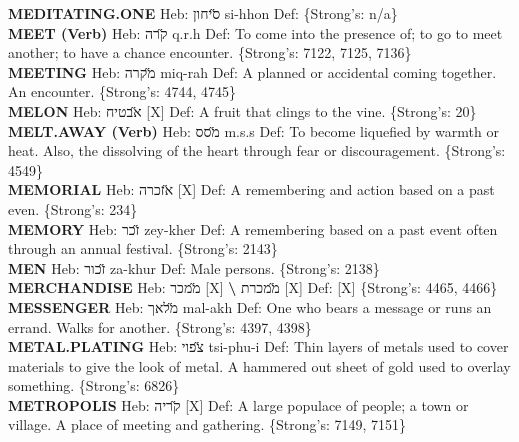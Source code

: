 {\textbf{MEDITATING.ONE} Heb: {\large\H סיחון} si-hhon Def: \{Strong's: n/a\}\hfill{}\\

\textbf{MEET (Verb)} Heb: {\large\H קרה} q.r.h Def: To come into the presence of; to go to meet another; to have a chance encounter. \{Strong's: 7122, 7125, 7136\}\hfill{}\\

\textbf{MEETING} Heb: {\large\H מקרה} miq-rah Def: A planned or accidental coming together. An encounter. \{Strong's: 4744, 4745\}\hfill{}\\

\textbf{MELON} Heb: {\large\H אבטיח} {[}X{]} Def: A fruit that clings to the vine. \{Strong's: 20\}\hfill{}\\

\textbf{MELT.AWAY (Verb)} Heb: {\large\H מסס} m.s.s Def: To become liquefied by warmth or heat. Also, the dissolving of the heart through fear or discouragement. \{Strong's: 4549\}\hfill{}\\

\textbf{MEMORIAL} Heb: {\large\H אזכרה} {[}X{]} Def: A remembering and action based on a past even. \{Strong's: 234\}\hfill{}\\

\textbf{MEMORY} Heb: {\large\H זכר} zey-kher Def: A remembering based on a past event often through an annual festival. \{Strong's: 2143\}\hfill{}\\

\textbf{MEN} Heb: {\large\H זכור} za-khur Def: Male persons. \{Strong's: 2138\}\hfill{}\\

\textbf{MERCHANDISE} Heb: {\large\H ממכר} {[}X{]} \textbf{\textbackslash{}} {\large\H ממכרת} {[}X{]} Def: {[}X{]} \{Strong's: 4465, 4466\}\hfill{}\\

\textbf{MESSENGER} Heb: {\large\H מלאך} mal-akh Def: One who bears a message or runs an errand. Walks for another. \{Strong's: 4397, 4398\}\hfill{}\\

\textbf{METAL.PLATING} Heb: {\large\H צפוי} tsi-phu-i Def: Thin layers of metals used to cover materials to give the look of metal. A hammered out sheet of gold used to overlay something. \{Strong's: 6826\}\hfill{}\\

\textbf{METROPOLIS} Heb: {\large\H קריה} {[}X{]} Def: A large populace of people; a town or village. A place of meeting and gathering. \{Strong's: 7149, 7151\}\hfill{}\\

}
